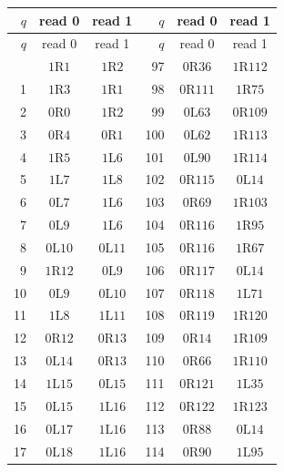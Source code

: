 \begingroup\small
\renewcommand{\arraystretch}{0.97}
\setlength{\LTpre}{4pt}\setlength{\LTpost}{4pt}
\begin{longtable}{@{}rcc@{\qquad\qquad}rcc@{}}
\toprule
$q$ & read 0 & read 1 & $q$ & read 0 & read 1 \\
\midrule
\endfirsthead
\toprule
$q$ & read 0 & read 1 & $q$ & read 0 & read 1 \\
\midrule
\endhead
\bottomrule
\endfoot
0 & $1\mathrm{R}1$ & $1\mathrm{R}2$ & 97 & $0\mathrm{R}36$ & $1\mathrm{R}112$ \\
1 & $1\mathrm{R}3$ & $1\mathrm{R}1$ & 98 & $0\mathrm{R}111$ & $1\mathrm{R}75$ \\
2 & $0\mathrm{R}0$ & $1\mathrm{R}2$ & 99 & $0\mathrm{L}63$ & $0\mathrm{R}109$ \\
3 & $0\mathrm{R}4$ & $0\mathrm{R}1$ & 100 & $0\mathrm{L}62$ & $1\mathrm{R}113$ \\
4 & $1\mathrm{R}5$ & $1\mathrm{L}6$ & 101 & $0\mathrm{L}90$ & $1\mathrm{R}114$ \\
5 & $1\mathrm{L}7$ & $1\mathrm{L}8$ & 102 & $0\mathrm{R}115$ & $0\mathrm{L}14$ \\
6 & $0\mathrm{L}7$ & $1\mathrm{L}6$ & 103 & $0\mathrm{R}69$ & $1\mathrm{R}103$ \\
7 & $0\mathrm{L}9$ & $1\mathrm{L}6$ & 104 & $0\mathrm{R}116$ & $1\mathrm{R}95$ \\
8 & $0\mathrm{L}10$ & $0\mathrm{L}11$ & 105 & $0\mathrm{R}116$ & $1\mathrm{R}67$ \\
9 & $1\mathrm{R}12$ & $0\mathrm{L}9$ & 106 & $0\mathrm{R}117$ & $0\mathrm{L}14$ \\
10 & $0\mathrm{L}9$ & $0\mathrm{L}10$ & 107 & $0\mathrm{R}118$ & $1\mathrm{L}71$ \\
11 & $1\mathrm{L}8$ & $1\mathrm{L}11$ & 108 & $0\mathrm{R}119$ & $1\mathrm{R}120$ \\
12 & $0\mathrm{R}12$ & $0\mathrm{R}13$ & 109 & $0\mathrm{R}14$ & $1\mathrm{R}109$ \\
13 & $0\mathrm{L}14$ & $0\mathrm{R}13$ & 110 & $0\mathrm{R}66$ & $1\mathrm{R}110$ \\
14 & $1\mathrm{L}15$ & $0\mathrm{L}15$ & 111 & $0\mathrm{R}121$ & $1\mathrm{L}35$ \\
15 & $0\mathrm{L}15$ & $1\mathrm{L}16$ & 112 & $0\mathrm{R}122$ & $1\mathrm{R}123$ \\
16 & $0\mathrm{L}17$ & $1\mathrm{L}16$ & 113 & $0\mathrm{R}88$ & $0\mathrm{L}14$ \\
17 & $0\mathrm{L}18$ & $1\mathrm{L}16$ & 114 & $0\mathrm{R}90$ & $1\mathrm{L}95$ \\

\end{longtable}
